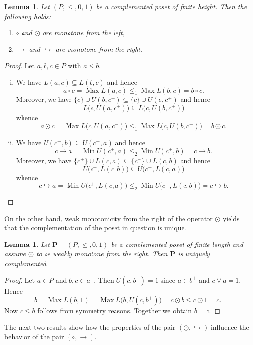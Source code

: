 \documentclass[12pt]{article}
\DeclareMathOperator{\Max}{Max}
\DeclareMathOperator{\Min}{Min}
\newtheorem{lemma}[theorem]{Lemma}
\begin{document}
\begin{lemma}
Let $(P,\le,0,1)$ be a complemented poset of finite height. Then the following holds:
\begin{enumerate}[{\rm(i)}]
\item $\circ$ and $\odot$ are monotone from the left,
\item $\to$ and $\hookrightarrow$ are monotone from the right.
\end{enumerate}	
\end{lemma}

\begin{proof}
Let $a,b,c\in P$ with $a\le b$.
\begin{enumerate}[(i)]
\item We have $L(a,c)\subseteq L(b,c)$ and hence
\[
a\circ c=\Max L(a,c)\le_1\Max L(b,c)=b\circ c.
\]
Moreover, we have $\{c\}\cup U(b,c^+)\subseteq\{c\}\cup U(a,c^+)$ and hence
\[
L\big(c,U(a,c^+)\big)\subseteq L\big(c,U(b,c^+)\big)
\]
whence
\[
a\odot c=\Max L\big(c,U(a,c^+)\big)\le_1\Max L\big(c,U(b,c^+)\big)=b\odot c.
\]
\item We have $U(c^+,b)\subseteq U(c^+,a)$ and hence
\[
c\to a=\Min U(c^+,a)\le_2\Min U(c^+,b)=c\to b.
\]
Moreover, we have $\{c^+\}\cup L(c,a)\subseteq\{c^+\}\cup L(c,b)$ and hence
\[
U\big(c^+,L(c,b)\big)\subseteq U\big(c^+,L(c,a)\big)
\]
whence
\[
c\hookrightarrow a=\Min U\big(c^+,L(c,a)\big)\le_2\Min U\big(c^+,L(c,b)\big)=c\hookrightarrow b.
\]
\end{enumerate}	
\end{proof}

On the other hand, weak monotonicity from the right of the operator $\odot$ yields that the complementation of the poset in question is unique.

\begin{lemma}
Let $\mathbf P=(P,\le,0,1)$ be a complemented poset of finite length and assume $\odot$ to be weakly monotone from the right. Then $\mathbf P$ is uniquely complemented.
\end{lemma}

\begin{proof}
Let $a\in P$ and $b,c\in a^+$. Then $U(c,b^+)=1$ since $a\in b^+$ and $c\vee a=1$. Hence
\[
b=\Max L(b,1)=\Max L\big(b,U(c,b^+)\big)=c\odot b\le c\odot1=c.
\]
Now $c\le b$ follows from symmetry reasons. Together we obtain $b=c$.	
\end{proof}

The next two results show how the properties of the pair $(\odot,\hookrightarrow)$ influence the behavior of the pair $(\circ,\to)$.
\end{document}
